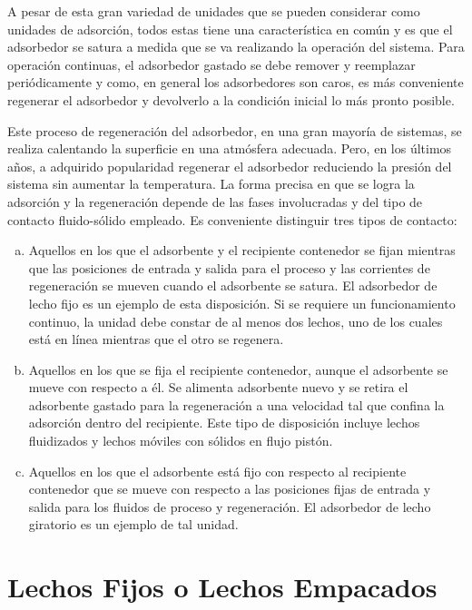 \documentclass[11pt]{book}
\begin{document}
A pesar de esta gran variedad de unidades que se pueden considerar como unidades de adsorción, todos estas tiene una característica en común y es que el adsorbedor se satura a medida que se va realizando la operación del sistema. Para operación continuas, el adsorbedor gastado se debe remover y reemplazar periódicamente y como, en general los adsorbedores son caros, es más conveniente regenerar el adsorbedor y devolverlo a la condición inicial lo más pronto posible.

Este proceso de regeneración del adsorbedor, en una gran mayoría de sistemas, se realiza calentando la superficie en una atmósfera adecuada. Pero, en los últimos años, a adquirido popularidad regenerar el adsorbedor reduciendo la presión del sistema sin aumentar la temperatura. La forma precisa en que se logra la adsorción y la regeneración depende de las fases involucradas y del tipo de contacto fluido-sólido empleado. Es conveniente distinguir tres tipos de contacto:

\begin{enumerate}[(a)]
    \item Aquellos en los que el adsorbente y el recipiente contenedor se fijan mientras que las posiciones de entrada y salida para el proceso y las corrientes de regeneración se mueven cuando el adsorbente se satura. El adsorbedor de lecho fijo es un ejemplo de esta disposición. Si se requiere un funcionamiento continuo, la unidad debe constar de al menos dos lechos, uno de los cuales está en línea mientras que el otro se regenera.
    
    \item Aquellos en los que se fija el recipiente contenedor, aunque el adsorbente se mueve con respecto a él. Se alimenta adsorbente nuevo y se retira el adsorbente gastado para la regeneración a una velocidad tal que confina la adsorción dentro del recipiente. Este tipo de disposición incluye lechos fluidizados y lechos móviles con sólidos en flujo pistón.
    
    \item Aquellos en los que el adsorbente está fijo con respecto al recipiente contenedor que se mueve con respecto a las posiciones fijas de entrada y salida para los fluidos de proceso y regeneración. El adsorbedor de lecho giratorio es un ejemplo de tal unidad.
\end{enumerate}

\section{Lechos Fijos o Lechos Empacados}
\end{document}
